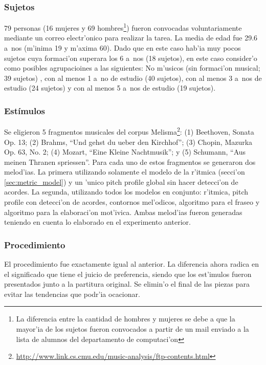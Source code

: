 \subsubsection{Sujetos}
79 personas (16 mujeres y 69 hombres\footnote{La diferencia entre la cantidad de hombres y mujeres se debe a que la mayor'ia de los sujetos fueron convocados a partir de un mail enviado a la lista de alumnos del departamento de computaci'on}) fueron convocadas voluntariamente mediante un correo electr'onico para realizar la tarea. La media de edad fue 29.6 a~nos (m'inima 19 y m'axima 60). Dado que en este caso hab'ia muy pocos sujetos cuya formaci'on
superara los 6 a~nos (18 sujetos), en este caso consider'o como posibles agrupacioines a las siguientes: No m'usicos (sin formaci'on musical; 39 sujetos)
, con al menos 1 a~no de estudio (40 sujetos), con al menos 3 a~nos de estudio (24 sujetos) y con al menos 5 a~nos de estudio (19 sujetos). 

\subsubsection{Est\'imulos}
Se eligieron 5 fragmentos musicales del corpus Melisma\footnote{\url{http://www.link.cs.cmu.edu/music-analysis/ftp-contents.html}}:
(1) Beethoven, Sonata Op. 13; (2) Brahms, ``Und gehst du ueber den Kirchhof''; (3) Chopin, Mazurka Op. 63, No. 2; 
(4) Mozart, ``Eine Kleine Nachtmusik''; y (5) Schumann, ``Aus meinen Thranen spriessen''. Para cada uno de estos fragmentos se generaron dos 
melod'ias. La primera utilizando solamente el modelo de la r'itmica (secci'on \ref{sec:metric_model}) y un 'unico pitch profile global sin hacer 
detecci'on de acordes. La segunda, utilizando todos los modelos en conjunto: r'itmica, pitch profile con detecci'on de acordes, contornos 
mel'odicos, algoritmo para el fraseo y algoritmo para la elaboraci'on mot'ivica. Ambas melod'ias fueron generadas teniendo en cuenta lo elaborado en
el experimento anterior.

\subsubsection{Procedimiento}
El procedimiento fue exactamente igual al anterior. La diferencia ahora radica en el significado que tiene el juicio de preferencia, 
siendo que los est'imulos fueron presentados junto a la partitura original. Se elimin'o el final de las piezas para evitar las tendencias
que podr'ia ocacionar.

